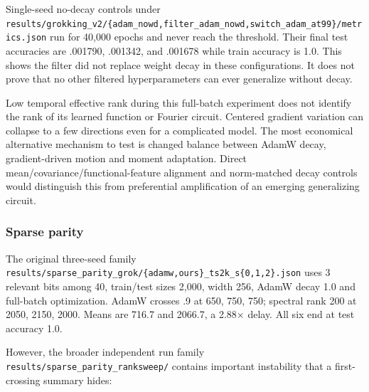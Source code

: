 \documentclass[
  british,
  10pt,
  a4paper,
]{article}
\begin{document}
Single-\allowbreak{}seed no-decay controls under
\texttt{results/\allowbreak{}grokking\_\allowbreak{}v2/\allowbreak{}\{\allowbreak{}adam\_\allowbreak{}nowd,\allowbreak{}filter\_\allowbreak{}adam\_\allowbreak{}nowd,\allowbreak{}switch\_\allowbreak{}adam\_\allowbreak{}at99\}\allowbreak{}/\allowbreak{}metrics.\allowbreak{}json}
run for 40,000 epochs and never reach the threshold. Their final test
accuracies are .001790, .001342, and .001678 while train accuracy is
1.0. This shows the filter did not replace weight decay in these
configuratio\allowbreak{}ns.\allowbreak{} It does not prove that no
other filtered hyperparameters can ever generalize without decay.

Low temporal effective rank during this full-batch experiment does not
identify the rank of its learned function or Fourier circuit. Centered
gradient variation can collapse to a few directions even for a
complicated model. The most economical alternative mechanism to test is
changed balance between AdamW decay, gradient-\allowbreak{}driven motion
and moment adaptation.\allowbreak{} Direct
mean/\allowbreak{}covariance/\allowbreak{}functional-\allowbreak{}feature
alignment and norm-\allowbreak{}matched decay controls would distinguish
this from preferential amplification of an emerging generalizing
circuit.

\subsubsection{Sparse parity}\label{classical-evidence--sparse-parity}

The original three-seed family
\texttt{results/\allowbreak{}sparse\_\allowbreak{}parity\_\allowbreak{}grok/\allowbreak{}\{\allowbreak{}adamw,\allowbreak{}ours\}\allowbreak{}\_\allowbreak{}ts2k\_\allowbreak{}s\{\allowbreak{}0,\allowbreak{}1,\allowbreak{}2\}\allowbreak{}.\allowbreak{}json}
uses 3 relevant bits among 40, train/test sizes 2,000, width 256, AdamW
decay 1.0 and full-batch optimization\allowbreak{}.\allowbreak{} AdamW
crosses .9 at 650, 750, 750; spectral rank 200 at 2050, 2150, 2000.
Means are 716.7 and 2066.7, a 2.88× delay. All six end at test accuracy
1.0.

However, the broader independent run family
\texttt{results/\allowbreak{}sparse\_\allowbreak{}parity\_\allowbreak{}ranksweep/\allowbreak{}}
contains important instability that a first-\allowbreak{}crossing
summary hides:
\end{document}
